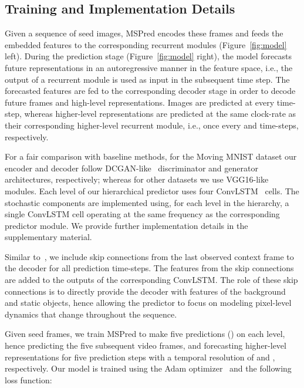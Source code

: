\documentclass{bmvc2k}
\newcommand{\Figure}[1]{Figure~\ref{#1}}
\begin{document}
\subsection{Training and Implementation Details}
\label{section: details}

Given a sequence of seed images, MSPred encodes these frames and feeds the embedded features to the corresponding recurrent modules (\Figure{fig:model} left).
During the prediction stage (\Figure{fig:model} right), the model forecasts future representations in an autoregressive manner in the feature space, i.e., the output of a recurrent module is used as input in the subsequent time step.
The forecasted features are fed to the corresponding decoder stage in order to decode future frames and high-level representations. Images are predicted at every time-step, whereas higher-level representations are predicted at the same clock-rate as their corresponding higher-level recurrent module, i.e., once every  and  time-steps, respectively.


For a fair comparison with baseline methods, for the Moving MNIST dataset our encoder and decoder follow DCGAN-like~\cite{Radford_DCGAN_2015} discriminator and generator architectures, respectively; whereas for other datasets we use VGG16-like~\cite{Zisserman_VGG_2014} modules.
Each level of our hierarchical predictor uses four ConvLSTM~\cite{Shi_ConvLSTMNetworkPrecipitationNowcasting_2015} cells.
The stochastic components are implemented using, for each level in the hierarchy, a single ConvLSTM cell operating at the same frequency as the corresponding predictor module.
We provide further implementation details in the supplementary material.

Similar to~\cite{Denton_StochasticVideoGenerationWithALearnedPrior_2018, Villegas_HighFidelityVideoPrediction_2019}, we include skip connections from the last observed context frame to the decoder for all prediction time-steps. The features from the skip connections are added to the outputs of the corresponding ConvLSTM.
The role of these skip connections is to directly provide the decoder with features of the background and static objects, hence allowing the predictor to focus on modeling pixel-level dynamics that change throughout the sequence.

Given  seed frames, we train MSPred to make five predictions () on each level, hence predicting the five subsequent video frames, and forecasting higher-level representations for five prediction steps with a temporal resolution of  and , respectively.
Our model is trained using the Adam optimizer~\cite{Kingma_Adam_2014} and the following loss function:
\end{document}
